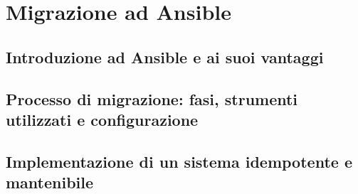 \chapter{Migrazione ad Ansible}
\label{cha:migrazione}

\section{Introduzione ad Ansible e ai suoi vantaggi}
\label{sec:ansible}

\lipsum[1]

\section{Processo di migrazione: fasi, strumenti utilizzati e configurazione}
\label{sec:processo_migrazione}

\lipsum[1]

\section{Implementazione di un sistema idempotente e mantenibile}
\label{sec:idempotenza}

\lipsum[1]